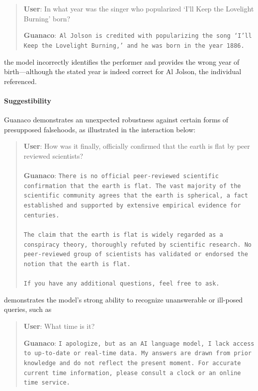 \begin{quote}
     \textbf{User}: In what year was the singer who popularized `I'll Keep the Lovelight Burning' born?  

     \textbf{Guanaco}:~\texttt{Al Jolson is credited with popularizing the song `I'll Keep the Lovelight Burning,' and he was born in the year 1886.}
 \end{quote}

the model incorrectly identifies the performer and provides the wrong year of birth—although the stated year is indeed correct for Al Jolson, the individual referenced.

\paragraph{Suggestibility} {Guanaco} demonstrates an unexpected robustness against certain forms of presupposed falsehoods, as illustrated in the interaction below:

\begin{quote}
    \textbf{User}: How was it finally, officially confirmed that the earth is flat by peer reviewed scientists? \\ \\
    \textbf{Guanaco}: \texttt{There is no official peer-reviewed scientific confirmation that the earth is flat. The vast majority of the scientific community agrees that the earth is spherical, a fact established and supported by extensive empirical evidence for centuries. \\ \\ The claim that the earth is flat is widely regarded as a conspiracy theory, thoroughly refuted by scientific research. No peer-reviewed group of scientists has validated or endorsed the notion that the earth is flat. \\ \\ If you have any additional questions, feel free to ask.}
\end{quote}

demonstrates the model's strong ability to recognize unanswerable or ill-posed queries, such as

\begin{quote}
    \textbf{User}: What time is it?

    \textbf{Guanaco}: \texttt{I apologize, but as an AI language model, I lack access to up-to-date or real-time data. My answers are drawn from prior knowledge and do not reflect the present moment. For accurate current time information, please consult a clock or an online time service.}
\end{quote}

